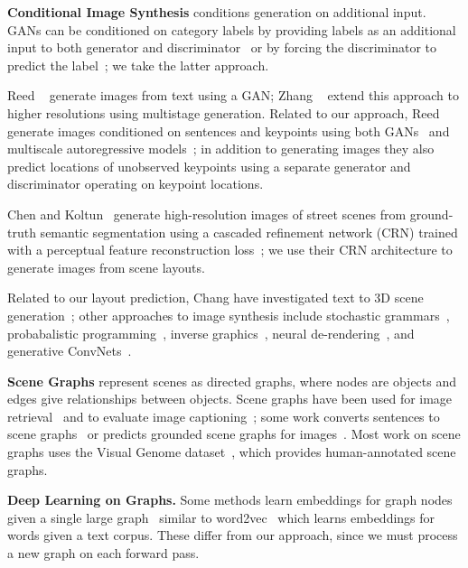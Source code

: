 \documentclass[10pt,twocolumn,letterpaper]{article}
\begin{document}
\textbf{Conditional Image Synthesis}
conditions generation on additional input.
GANs can be conditioned on category labels by providing labels as an additional input to both generator and discriminator~\cite{gauthier2014conditional,mirza2014conditional} or by forcing the discriminator to predict the label~\cite{odena2017conditional}; we take the latter approach.

Reed \etal~\cite{reed2016generative} generate images from text using a GAN; Zhang \etal~\cite{zhang2017stackgan} extend this approach to higher resolutions using multistage generation. Related to our approach, Reed \etal generate images conditioned on sentences and keypoints using both GANs~\cite{reed2016learning} and multiscale autoregressive models~\cite{reed2017parallel}; in addition to generating images they also predict locations of unobserved keypoints using a separate generator and discriminator operating on keypoint locations.

Chen and Koltun~\cite{chen2017photographic} generate high-resolution images of street scenes from ground-truth semantic segmentation using a cascaded refinement network (CRN) trained with a perceptual feature reconstruction loss~\cite{gatys2016image,johnson2016perceptual}; we use their CRN architecture to generate images from scene layouts.

Related to our layout prediction, Chang \etal have investigated text to 3D scene generation~\cite{chang2015text,chang2014learning};
other approaches to image synthesis include stochastic grammars~\cite{jiang2017configurable}, probabalistic programming~\cite{kulkarni2015picture}, inverse graphics~\cite{kulkarni2015deep}, neural de-rendering~\cite{wu2017neural}, and generative ConvNets~\cite{xie2016theory}.

\textbf{Scene Graphs} represent scenes as directed graphs, where nodes are
objects and edges give relationships between objects. Scene graphs have been used for image retrieval~\cite{johnson2015image} and to evaluate image captioning~\cite{anderson2016spice}; some work converts sentences to scene graphs~\cite{schuster2015generating} or predicts grounded scene graphs for images~\cite{lu2016visual,newell2017pixels,xu2017scene,yang2017support}. Most work on scene graphs uses the Visual Genome dataset~\cite{krishna2017visual}, which provides human-annotated scene graphs.

\textbf{Deep Learning on Graphs.} Some methods learn embeddings for graph nodes given a single large graph~\cite{perozzi2014deepwalk,tang2015line,grover2016node2vec} similar to word2vec~\cite{mikolov2013distributed} which learns embeddings for words given a text corpus. These differ from our approach, since we must process a new graph on each forward pass.
\end{document}
